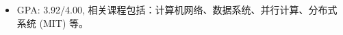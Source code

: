 
\begin{itemize}[nosep]
  \item GPA: 3.92/4.00, 相关课程包括：计算机网络、数据系统、并行计算、分布式系统 (MIT) 等。
\end{itemize}

